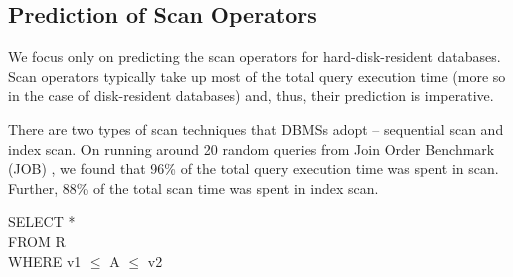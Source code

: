 \documentclass{article}
\begin{document}
\begin{multicols}{2}
	\section{Prediction of Scan Operators}
	\label{sec:scan}
	We focus only on predicting the scan operators for hard-disk-resident databases. Scan operators typically take up most of the total query execution time (more so in the case of disk-resident databases) and, thus, their prediction is imperative. 
	
	There are two types of scan techniques that DBMSs adopt -- sequential scan and index scan. On running around 20 random queries from Join Order Benchmark (JOB) \cite{job}, we found that 96\% of the total query execution time was spent in scan. Further, 88\% of the total scan time was spent in index scan. 
	
	

	\begin{center}
		\begin{boxedminipage}{.48\linewidth} 
			\small{
				{\sf \hspace*{0.05in} SELECT * \\
					\hspace*{0.05in} FROM R\\
					\hspace*{0.05in} WHERE v1 $\leq$ A $\leq$ v2}
			}
			\label{fig:template_q}
		\end{boxedminipage}
		

\end{center}
\end{multicols}
\end{document}
